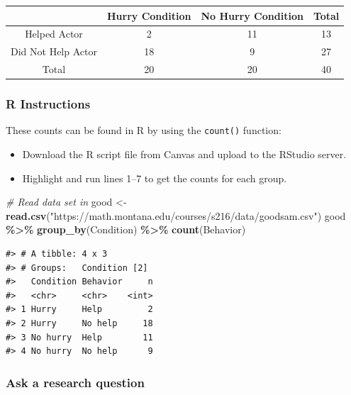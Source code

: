 \documentclass[
]{report}
\newenvironment{Shaded}{\begin{snugshade}}{\end{snugshade}}
\newcommand{\CommentTok}[1]{\textcolor[rgb]{0.56,0.35,0.01}{\textit{#1}}}
\newcommand{\FunctionTok}[1]{\textcolor[rgb]{0.13,0.29,0.53}{\textbf{#1}}}
\newcommand{\NormalTok}[1]{#1}
\newcommand{\OtherTok}[1]{\textcolor[rgb]{0.56,0.35,0.01}{#1}}
\newcommand{\SpecialCharTok}[1]{\textcolor[rgb]{0.81,0.36,0.00}{\textbf{#1}}}
\newcommand{\StringTok}[1]{\textcolor[rgb]{0.31,0.60,0.02}{#1}}
\begin{document}
\vspace{2mm}
\newpage

\begin{center}
\begin{tabular}{|c|c|c|c|}\hline
& Hurry Condition & No Hurry Condition & Total \\ \hline
Helped Actor & 2 & 11 & 13 \\ \hline
Did Not Help Actor & 18 & 9 & 27 \\ \hline
Total & 20 & 20 & 40 \\ \hline
\end{tabular}
\end{center}

\subsubsection*{R Instructions}\label{r-instructions-8}

These counts can be found in R by using the \texttt{count()} function:

\begin{itemize}
\item
  Download the R script file from Canvas and upload to the RStudio server.
\item
  Highlight and run lines 1--7 to get the counts for each group.
\end{itemize}

\begin{Shaded}
\begin{Highlighting}[]
\CommentTok{\# Read data set in}
\NormalTok{good }\OtherTok{\textless{}{-}} \FunctionTok{read.csv}\NormalTok{(}\StringTok{"https://math.montana.edu/courses/s216/data/goodsam.csv"}\NormalTok{) }
\NormalTok{good }\SpecialCharTok{\%\textgreater{}\%} \FunctionTok{group\_by}\NormalTok{(Condition) }\SpecialCharTok{\%\textgreater{}\%} \FunctionTok{count}\NormalTok{(Behavior)}
\end{Highlighting}
\end{Shaded}

\begin{verbatim}
#> # A tibble: 4 x 3
#> # Groups:   Condition [2]
#>   Condition Behavior     n
#>   <chr>     <chr>    <int>
#> 1 Hurry     Help         2
#> 2 Hurry     No help     18
#> 3 No hurry  Help        11
#> 4 No hurry  No help      9
\end{verbatim}

\subsubsection*{Ask a research question}\label{ask-a-research-question-2}
\end{document}
